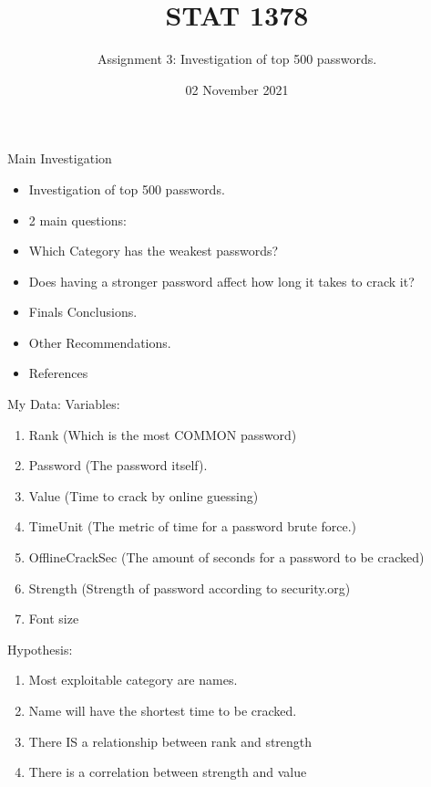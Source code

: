 \documentclass[10pt,ignorenonframetext,aspectratio=169]{beamer}
\title[]{STAT 1378}
\subtitle{Assignment 3: Investigation of top 500 passwords.}
\date[
      02 November 2021
  ]{
      02 November 2021
        }
\providecommand{\tightlist}{%
  \setlength{\itemsep}{0pt}\setlength{\parskip}{0pt}}
\begin{document}
  \begin{frame}[plain]
  \titlepage
  \end{frame}



\begin{frame}{Main Investigation}
\protect\hypertarget{main-investigation}{}
\begin{itemize}
\tightlist
\item
  Investigation of top 500 passwords.
\item
  2 main questions:
\item
  Which Category has the weakest passwords?
\item
  Does having a stronger password affect how long it takes to crack it?
\item
  Finals Conclusions.
\item
  Other Recommendations.
\item
  References
\end{itemize}
\end{frame}

\begin{frame}{My Data:}
\protect\hypertarget{my-data}{}
Variables:

\begin{enumerate}
\tightlist
\item
  \alert{Rank} (Which is the most COMMON password)
\item
  \alert{Password} (The password itself).
\item
  \alert{Value} (Time to crack by online guessing)
\item
  \alert{TimeUnit} (The metric of time for a password brute force.)
\item
  \alert{OfflineCrackSec} (The amount of seconds for a password to be
  cracked)
\item
  \alert{Strength} (Strength of password according to security.org)
\item
  \alert{Font size}
\end{enumerate}
\end{frame}

\begin{frame}{Hypothesis:}
\protect\hypertarget{hypothesis}{}
\begin{enumerate}
\tightlist
\item
  Most exploitable category are names.
\item
  Name will have the shortest time to be cracked.
\item
  There IS a relationship between rank and strength
\item
  There is a correlation between strength and value
\end{enumerate}
\end{frame}
\end{document}
